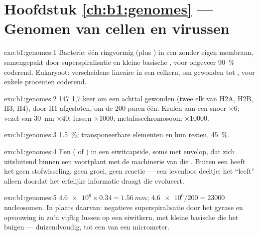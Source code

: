 \section*{Hoofdstuk \ref{ch:b1:genomes} --- Genomen van cellen en virussen}

\begin{solution}{exo:b1:genomes:1}
Bacterie: één ringvormig  (plus ) in een  zonder
eigen membraan, samengepakt door superspiralisatie en kleine basische , voor
ongeveer \qty{90}{\%} coderend. Eukaryoot: verscheidene lineaire  in een
celkern, om  gewonden tot , voor enkele procenten coderend.
\end{solution}

\begin{solution}{exo:b1:genomes:2}
147  1,7 keer om een achttal  gewonden (twee elk van H2A, H2B,
H3, H4), door H1 afgesloten, om de 200 paren één. Kralen aan een snoer $\times 6$;
vezel van \qty{30}{nm} $\times 40$; lussen $\times 1000$; metafasechromosoom
$\times \num{10000}$.
\end{solution}

\begin{solution}{exo:b1:genomes:3}
\qty{1.5}{\%}; transponeerbare elementen en hun resten, \qty{45}{\%}.
\end{solution}

\begin{solution}{exo:b1:genomes:4}
Een  ( of ) in een eiwitcapside, soms met envelop, dat zich uitsluitend
binnen een  voortplant met de machinerie van die . Buiten een  heeft het
geen stofwisseling, geen groei, geen reactie --- een levenloos deeltje; het
``leeft'' alleen doordat het erfelijke informatie draagt die evolueert.
\end{solution}

\begin{solution}{exo:b1:genomes:5}
$\num{4.6e6}\times 0.34 = \qty{1.56}{mm}$; $\num{4.6e6}/200 = \num{23000}$
nucleosomen. In plaats daarvan: negatieve superspiralisatie door het gyrase en
opvouwing in zo'n vijftig lussen op een eiwitkern, met kleine basische  die
het  buigen --- duizendvoudig, tot een  van een micrometer.
\end{solution}

